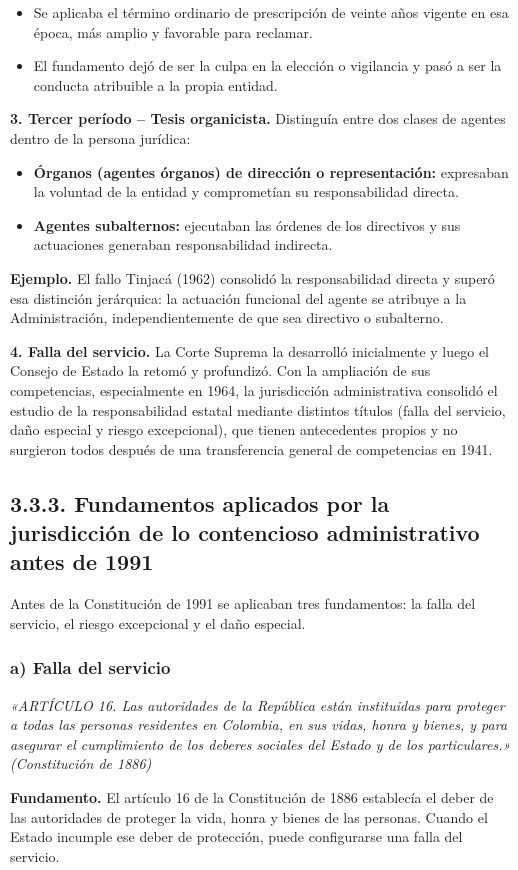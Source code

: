 \begin{itemize}
\item Se aplicaba el término ordinario de prescripción de veinte años vigente en esa época, más amplio y favorable para reclamar.
\item El fundamento dejó de ser la culpa en la elección o vigilancia y pasó a ser la conducta atribuible a la propia entidad.
\end{itemize}
\textbf{3. Tercer período – Tesis organicista.} Distinguía entre dos clases de agentes dentro de la persona jurídica:

\begin{itemize}
\item \textbf{Órganos (agentes órganos) de dirección o representación:} expresaban la voluntad de la entidad y comprometían su responsabilidad directa.
\item \textbf{Agentes subalternos:} ejecutaban las órdenes de los directivos y sus actuaciones generaban responsabilidad indirecta.
\end{itemize}
\begin{ejemplo}
\textcolor[HTML]{4F6228}{\textbf{Ejemplo. }}El fallo Tinjacá (1962) consolidó la responsabilidad directa y superó esa distinción jerárquica: la actuación funcional del agente se atribuye a la Administración, independientemente de que sea directivo o subalterno.
\end{ejemplo}
\textbf{4. Falla del servicio.} La Corte Suprema la desarrolló inicialmente y luego el Consejo de Estado la retomó y profundizó. Con la ampliación de sus competencias, especialmente en 1964, la jurisdicción administrativa consolidó el estudio de la responsabilidad estatal mediante distintos títulos (falla del servicio, daño especial y riesgo excepcional), que tienen antecedentes propios y no surgieron todos después de una transferencia general de competencias en 1941.

\subsection{3.3.3. Fundamentos aplicados por la jurisdicción de lo contencioso administrativo antes de 1991}
Antes de la Constitución de 1991 se aplicaban tres fundamentos: la falla del servicio, el riesgo excepcional y el daño especial.

\subsubsection{a) Falla del servicio}
\begin{cita}
\textit{«ARTÍCULO 16. Las autoridades de la República están instituidas para proteger a todas las personas residentes en Colombia, en sus vidas, honra y bienes, y para asegurar el cumplimiento de los deberes sociales del Estado y de los particulares.» (Constitución de 1886)}
\end{cita}
\textbf{Fundamento.} El artículo 16 de la Constitución de 1886 establecía el deber de las autoridades de proteger la vida, honra y bienes de las personas. Cuando el Estado incumple ese deber de protección, puede configurarse una falla del servicio.

